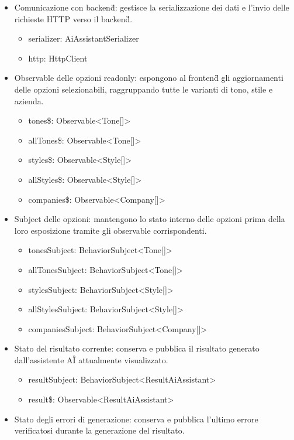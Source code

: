 \documentclass[a4paper,11pt]{article}
\begin{document}
\begin{itemize}[noitemsep, topsep=0pt]
  \item Comunicazione con backend\G{}: gestisce la serializzazione dei dati e l'invio delle richieste HTTP verso il backend\G{}.
  \begin{itemize}[noitemsep, topsep=0pt]
    \item serializer: AiAssistantSerializer
    \item http: HttpClient
  \end{itemize}
  \item Observable delle opzioni readonly: espongono al frontend\G{} gli aggiornamenti delle opzioni selezionabili, raggruppando tutte le varianti di tono, stile e azienda.
  \begin{itemize}[noitemsep, topsep=0pt]
    \item tones\$: Observable<Tone[]>
    \item allTones\$: Observable<Tone[]>
    \item styles\$: Observable<Style[]>
    \item allStyles\$: Observable<Style[]>
    \item companies\$: Observable<Company[]>
  \end{itemize}
  \item Subject delle opzioni: mantengono lo stato interno delle opzioni prima della loro esposizione tramite gli observable corrispondenti.
  \begin{itemize}[noitemsep, topsep=0pt]
    \item tonesSubject: BehaviorSubject<Tone[]>
    \item allTonesSubject: BehaviorSubject<Tone[]>
    \item stylesSubject: BehaviorSubject<Style[]>
    \item allStylesSubject: BehaviorSubject<Style[]>
    \item companiesSubject: BehaviorSubject<Company[]>
  \end{itemize}
  \item Stato del risultato corrente: conserva e pubblica il risultato generato dall'assistente AI\G{} attualmente visualizzato.
  \begin{itemize}[noitemsep, topsep=0pt]
    \item resultSubject: BehaviorSubject<ResultAiAssistant>
    \item result\$: Observable<ResultAiAssistant>
  \end{itemize}
  \item Stato degli errori di generazione: conserva e pubblica l'ultimo errore verificatosi durante la generazione del risultato.

\end{itemize}
\end{document}
